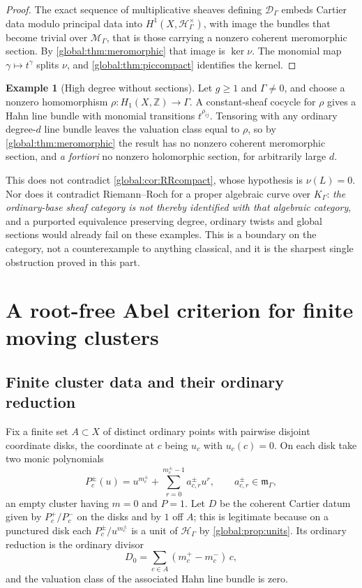 \documentclass[11pt,letterpaper]{article}
\theoremstyle{definition}
\newtheorem{example}[example]{Example}
\theoremstyle{remark}
\newcommand{\Z}{\mathbb Z}
\newcommand{\HH}{\mathscr H_\Gamma}
\newcommand{\KK}{K_\Gamma}
\newcommand{\mK}{\mathfrak m_\Gamma}
\newcommand{\MG}{\mathscr M_\Gamma}
\newcommand{\DG}{\mathscr D_\Gamma}
\numberwithin{equation}{section}
\begin{document}
\begin{proof}
The exact sequence of multiplicative sheaves defining $\DG$ embeds Cartier data modulo principal data into $H^1(X,\HH^\times)$, with image the bundles that become trivial over $\MG$, that is those carrying a nonzero coherent meromorphic section. By \cref{global:thm:meromorphic} that image is $\ker\nu$. The monomial map $\gamma\mapsto t^\gamma$ splits $\nu$, and \cref{global:thm:piccompact} identifies the kernel.
\end{proof}

\begin{example}[High degree without sections]\label{global:ex:highdegree}
Let $g\ge1$ and $\Gamma\ne0$, and choose a nonzero homomorphism $\rho:H_1(X,\Z)\to\Gamma$. A constant-sheaf cocycle for $\rho$ gives a Hahn line bundle with monomial transitions $t^{\rho_{ij}}$. Tensoring with any ordinary degree-$d$ line bundle leaves the valuation class equal to $\rho$, so by \cref{global:thm:meromorphic} the result has no nonzero coherent meromorphic section, and \emph{a fortiori} no nonzero holomorphic section, for arbitrarily large $d$.

This does not contradict \cref{global:cor:RRcompact}, whose hypothesis is $\nu(L)=0$. Nor does it contradict Riemann--Roch for a proper algebraic curve over $\KK$: \emph{the ordinary-base sheaf category is not thereby identified with that algebraic category}, and a purported equivalence preserving degree, ordinary twists and global sections would already fail on these examples. This is a boundary on the category, not a counterexample to anything classical, and it is the sharpest single obstruction proved in this part.
\end{example}

\section{A root-free Abel criterion for finite moving clusters}\label{global:sec:abelcompact}

\subsection{Finite cluster data and their ordinary reduction}

Fix a finite set $A\subset X$ of distinct ordinary points with pairwise disjoint coordinate disks, the coordinate at $c$ being $u_c$ with $u_c(c)=0$. On each disk take two monic polynomials
\begin{equation}\label{global:eq:clusters}
  P_c^\pm(u)=u^{m_c^\pm}+\sum_{r=0}^{m_c^\pm-1}a^\pm_{c,r}u^r,
  \qquad a^\pm_{c,r}\in\mK,
\end{equation}
an empty cluster having $m=0$ and $P=1$. Let $D$ be the coherent Cartier datum given by $P_c^+/P_c^-$ on the disks and by $1$ off $A$; this is legitimate because on a punctured disk each $P^\pm_c/u^{m^\pm_c}$ is a unit of $\HH$ by \cref{global:prop:units}. Its ordinary reduction is the ordinary divisor
\begin{equation}\label{global:eq:D0}
  D_0=\sum_{c\in A}(m_c^+-m_c^-)\,c,
\end{equation}
and the valuation class of the associated Hahn line bundle is zero.
\end{document}
